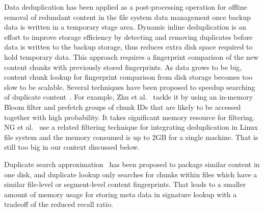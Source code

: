 Data deduplication has been applied as  a post-processing operation for offline removal
of redundant content in the file system data management once backup data is written in a temporary stage area.
Dynamic inline deduplication is an effort to improve storage efficiency  
by detecting and removing  duplicates before data is written to the backup storage,
thus reduces extra disk space required to hold temporary data. 
This approach requires a fingerprint  comparison of the new content chunks with
previously stored fingerprints. 
As data grows to be big, content chunk lookup for fingerprint comparison from disk storage
becomes too slow to be scalable.
Several techniques have been proposed to speedup searching of duplicate 
content~\cite{bottleneck08,extreme_binning09,sparseindex09}. For example,  
Zhu et al.~\cite{bottleneck08} tackle it 
by using an in-memory Bloom filter and prefetch groups of chunk IDs that are likely to be 
accessed together with high probability. It takes significant memory resource for filtering.
NG et al.~\cite{ NGmiddleware2011}  use  
a related filtering technique for integrating deduplication in Linux  file system and the memory
consumed is up to 2GB for a single machine. That is still too big in our context discussed below. 

Duplicate  search approximation~\cite{extreme_binning09,sparseindex09}  has been proposed 
to package similar content in one disk, and duplicate lookup  only searches
for chunks within files which have a similar file-level or segment-level  content fingerprints.
That leads  to a smaller amount of memory usage for storing meta data in signature
lookup with a tradeoff of the reduced recall ratio. 

